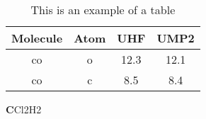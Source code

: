 \begin{table}
  \caption{This is an example of a table}
  \label{tbl:sampletable}
  \begin{tabular}{c c c c}
    \hline
    Molecule & Atom & UHF & UMP2 \\ 
    \hline
    co & o & 12.3 & 12.1 \\ 
    co & c & 8.5 & 8.4 \\ 
    \hline
  \end{tabular}
\end{table}
\textbf{C}Cl2H2
